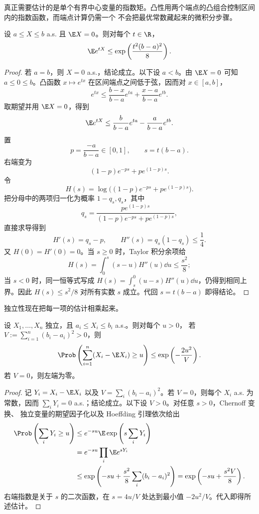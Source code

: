 真正需要估计的是单个有界中心变量的指数矩。凸性用两个端点的凸组合控制区间内的指数函数，而端点计算仍需一个
不会把最优常数藏起来的微积分步骤。

\begin{lemma}[Hoeffding 引理]\label{lemma:5-4-1-1}
设 $a\leq X\leq b$ a.s. 且 $\E X=0$。则对每个 $t\in\R$，
\[
 \E e^{tX}\leq\exp\left(\frac{t^2(b-a)^2}{8}\right).
\]
\end{lemma}

\begin{proof}
若 $a=b$，则 $X=0$ a.s.，结论成立。以下设 $a<b$。由 $\E X=0$ 可知
$a\leq0\leq b$。凸函数 $x\mapsto e^{tx}$ 在区间端点之间低于弦，因而对
$x\in[a,b]$，
\[
 e^{tx}\leq \frac{b-x}{b-a}e^{ta}+\frac{x-a}{b-a}e^{tb}.
\]
取期望并用 $\E X=0$，得到
\[
 \E e^{tX}\leq\frac{b}{b-a}e^{ta}-\frac{a}{b-a}e^{tb}.
\]
置
\[
 p=\frac{-a}{b-a}\in[0,1],\qquad s=t(b-a).
\]
右端变为
\[
 (1-p)e^{-ps}+pe^{(1-p)s}.
\]
令
\[
 H(s)=\log\bigl((1-p)e^{-ps}+pe^{(1-p)s}\bigr).
\]
把分母中的两项归一化为概率 $1-q_s,q_s$，其中
\[
 q_s=\frac{pe^{(1-p)s}}
 {(1-p)e^{-ps}+pe^{(1-p)s}},
\]
直接求导得到
\[
 H'(s)=q_s-p,\qquad H''(s)=q_s(1-q_s)\leq\frac14.
\]
又 $H(0)=H'(0)=0$。当 $s\geq0$ 时，Taylor 积分余项给
\[
 H(s)=\int_0^s(s-u)H''(u)\dd u\leq\frac{s^2}{8};
\]
当 $s<0$ 时，同一恒等式写成
$H(s)=\int_s^0(u-s)H''(u)\dd u$，仍得到相同上界。因此
$H(s)\leq s^2/8$ 对所有实数 $s$ 成立。代回 $s=t(b-a)$ 即得结论。
\end{proof}

独立性现在把每一项的估计相乘起来。

\begin{theorem}\label{theorem:5-4-1-2}
设 $X_1,\dots,X_n$ 独立，且
$a_i\leq X_i\leq b_i$ a.s.。则对每个 $u>0$，
若 $V:=\sum_{i=1}^n(b_i-a_i)^2>0$，则
\[
 \Prob\left(\sum_{i=1}^n(X_i-\E X_i)\geq u\right)
 \leq
 \exp\left(-\frac{2u^2}{V}\right).
\]
若 $V=0$，则左端为零。
\end{theorem}

\begin{proof}
记 $Y_i=X_i-\E X_i$ 以及
$V=\sum_i(b_i-a_i)^2$。若 $V=0$，则每个 $X_i$ a.s. 为常数，因而
$\sum_iY_i=0$ a.s.；结论成立。以下设 $V>0$。对任意 $s>0$，Chernoff 变换、
独立变量的期望因子化以及 Hoeffding 引理依次给出
\begin{align*}
 \Prob\left(\sum_iY_i\geq u\right)
 &\leq e^{-su}\E\exp\left(s\sum_iY_i\right)\\
 &=e^{-su}\prod_i\E e^{sY_i}\\
 &\leq\exp\left(-su+\frac{s^2}{8}
                  \sum_i(b_i-a_i)^2\right)
 =\exp\left(-su+\frac{s^2V}{8}\right).
\end{align*}
右端指数是关于 $s$ 的二次函数，在 $s=4u/V$ 处达到最小值
$-2u^2/V$。代入即得所述估计。
\end{proof}

